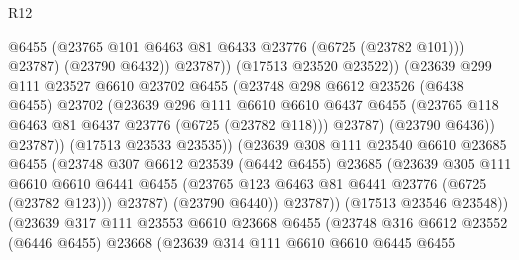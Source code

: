 \begin{lexlean}{R12}
\begin{coremodule}
{{{{{{{{{{{{{{{{{{{{{{{{{{{{{{{{{{{{{{{{{{{{{{{{{{{{{{{{{{{{{{{{{{{{{{{{{{{{{{{{{{                                  @6455
                                  (@23765 @101 @6463 @81 @6433 @23776 (@6725 (@23782 @101)))
                                  @23787)
                                (@23790 @6432))
                              @23787))
                          (@17513 @23520 @23522))
                        (@23639
                          @299
                          @111
                          @23527
                          @6610
                          @23702
                          @6455
                          (@23748
                            @298
                            @6612
                            @23526
                            (@6438 @6455)
                            @23702
                            (@23639
                              @296
                              @111
                              @6610
                              @6610
                              @6437
                              @6455
                              (@23765 @118 @6463 @81 @6437 @23776 (@6725 (@23782 @118)))
                              @23787)
                            (@23790 @6436))
                          @23787))
                      (@17513 @23533 @23535))
                    (@23639
                      @308
                      @111
                      @23540
                      @6610
                      @23685
                      @6455
                      (@23748
                        @307
                        @6612
                        @23539
                        (@6442 @6455)
                        @23685
                        (@23639
                          @305
                          @111
                          @6610
                          @6610
                          @6441
                          @6455
                          (@23765 @123 @6463 @81 @6441 @23776 (@6725 (@23782 @123)))
                          @23787)
                        (@23790 @6440))
                      @23787))
                  (@17513 @23546 @23548))
                (@23639
                  @317
                  @111
                  @23553
                  @6610
                  @23668
                  @6455
                  (@23748
                    @316
                    @6612
                    @23552
                    (@6446 @6455)
                    @23668
                    (@23639
                      @314
                      @111
                      @6610
                      @6610
                      @6445
                      @6455
}}}}}}}}}}}}}}}}}}}}}}}}}}}}}}}}}}}}}}}}}}}}}}}}}}}}}}}}}}}}}}}}}}}}}}}}}}}}}}}}}}
\end{coremodule}
\end{lexlean}
